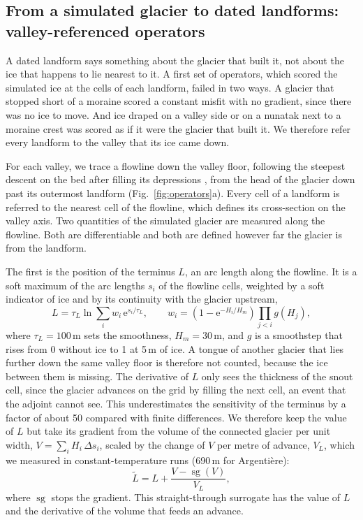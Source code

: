 \documentclass[tc, manuscript]{copernicus}
\newcommand{\sg}{\operatorname{sg}}
\begin{document}
\subsection{From a simulated glacier to dated landforms: valley-referenced operators}
\label{sec:operators}

A dated landform says something about the glacier that built it, not about the ice that happens to lie nearest to it. A first set of operators, which scored the simulated ice at the cells of each landform, failed in two ways. A glacier that stopped short of a moraine scored a constant misfit with no gradient, since there was no ice to move. And ice draped on a valley side or on a nunatak next to a moraine crest was scored as if it were the glacier that built it. We therefore refer every landform to the valley that its ice came down.

For each valley, we trace a flowline down the valley floor, following the steepest descent on the bed after filling its depressions \citep{barnes2014}, from the head of the glacier down past its outermost landform (Fig.~\ref{fig:operators}a). Every cell of a landform is referred to the nearest cell of the flowline, which defines its cross-section on the valley axis. Two quantities of the simulated glacier are measured along the flowline. Both are differentiable and both are defined however far the glacier is from the landform.

The first is the position of the terminus $L$, an arc length along the flowline. It is a soft maximum of the arc lengths $s_i$ of the flowline cells, weighted by a soft indicator of ice and by its continuity with the glacier upstream,
\begin{equation}
L = \tau_L\ln\sum_i w_i\,\mathrm{e}^{s_i/\tau_L},\qquad
w_i = \left(1-\mathrm{e}^{-H_i/H_m}\right)\prod_{j<i}g(H_j),
\label{eq:terminus}
\end{equation}
where $\tau_L=100$\,m sets the smoothness, $H_m=30$\,m, and $g$ is a smoothstep that rises from 0 without ice to 1 at 5\,m of ice. A tongue of another glacier that lies further down the same valley floor is therefore not counted, because the ice between them is missing. The derivative of $L$ only sees the thickness of the snout cell, since the glacier advances on the grid by filling the next cell, an event that the adjoint cannot see. This underestimates the sensitivity of the terminus by a factor of about 50 compared with finite differences. We therefore keep the value of $L$ but take its gradient from the volume of the connected glacier per unit width, $V=\sum_i H_i\,\Delta s_i$, scaled by the change of $V$ per metre of advance, $V_L$, which we measured in constant-temperature runs (690\,m for Argenti\`ere):
\begin{equation}
\tilde L = L + \frac{V-\sg(V)}{V_L},
\label{eq:surrogate}
\end{equation}
where $\sg$ stops the gradient. This straight-through surrogate \citep{bengio2013} has the value of $L$ and the derivative of the volume that feeds an advance.
\end{document}
